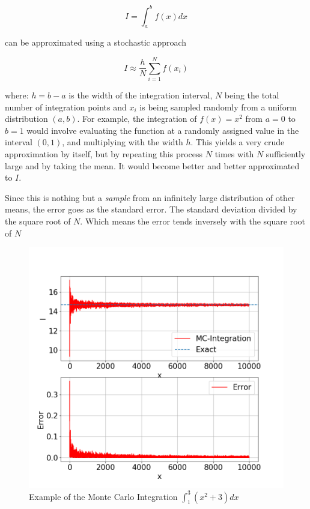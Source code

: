 \documentclass[aip,nobalancelastpage,
twocolumn,
rsi,%
 amsmath,amssymb,
 reprint,%
]{revtex4}
\begin{document}
\begin{equation}
\label{simpleIntegration}
I = \int_a^b f(x) dx
\end{equation}

can be approximated using a stochastic approach

\begin{equation}
I \approx \frac{h}{N}\sum_{i=1}^N f(x_i)
\end{equation}

where: $h=b-a$ is the width of the integration interval, $N$ being the total number of integration points and $x_i$ is being sampled randomly from a uniform distribution $(a,b)$. For example, the integration of $f(x)=x^2$ from $a=0$ to $b=1$ would involve evaluating the function at a randomly assigned value in the interval $(0,1)$, and multiplying with the width $h$. This yields a very crude approximation by itself, but by repeating this process $N$ times with $N$ sufficiently large and by taking the mean. It would become better and better approximated to $I$.\par 
Since this is nothing but a \textit{sample} from an infinitely large distribution of other means, the error goes as the standard error. The standard deviation divided by the square root of $N$. Which means the error tends inversely with the square root of $N$

\begin{figure}[H]
\center
\caption{Example of the Monte Carlo Integration $\int_1^3 (x^2+3)dx$}
\includegraphics[scale=0.4]{mcint.png}
\end{figure}
\end{document}
